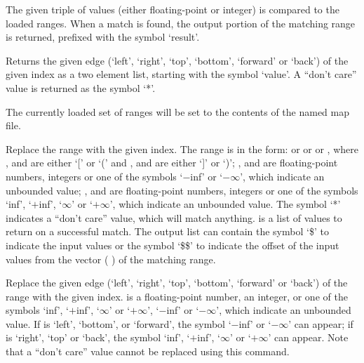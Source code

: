   The given triple of values (either floating-point or integer) is compared to the loaded ranges.
  When a match is found, the output portion of the matching range is returned, prefixed with the symbol
  `result'.
  
  Returns the given edge (`left', `right', `top', `bottom', `forward' or `back') of the given index as a
  two element list, starting with the symbol `value'.
  A ``don't care'' value is returned as the symbol `*'.

  The currently loaded set of ranges will be set to the contents of the named map file.
  
  Replace the range with the given index.
  The range is in the form:  or   or   or , where
  ,  and  are either `[' or `(' and ,  and  are
  either `]' or `)';
  ,  and  are floating-point numbers, integers or one of the symbols `$-$inf' or
  `$-\infty$', which indicate an unbounded value;
  ,  and  are floating-point numbers, integers or one of the symbols `inf', `$+$inf',
  `$\infty$' or `$+\infty$', which indicate an unbounded value.
  The symbol `*' indicates a ``don't care'' value, which will match anything.
   is a list of values to return on a successful match.
  The output list can contain the symbol `\$' to indicate the input values or the symbol `\$\$' to
  indicate the offset of the input values from the vector (  ) of the
  matching range.
  
  Replace the given edge (`left', `right', `top', `bottom', `forward' or `back') of the range with the
  given index.
   is a floating-point number, an integer, or one of the symbols `inf', `$+$inf',
  `$\infty$' or `$+\infty$', `$-$inf' or `$-\infty$', which indicate an unbounded value.
  If  is `left', `bottom', or `forward', the symbol `$-$inf' or `$-\infty$' can appear;
  if  is `right', `top' or `back', the symbol `inf', `$+$inf', `$\infty$' or `$+\infty$' can appear.
  Note that a ``don't care'' value cannot be replaced using this command.

